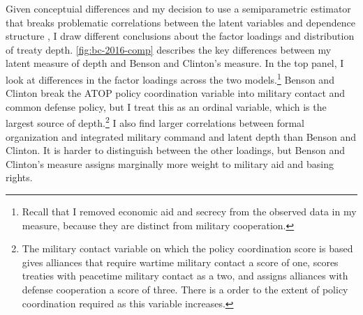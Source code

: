\documentclass[12pt]{article}
\begin{document}
Given conceptuial differences and my decision to use a semiparametric estimator that breaks problematic correlations between the latent variables and dependence structure \citep{Murrayetal2013}, I draw different conclusions about the factor loadings and distribution of treaty depth. 
\autoref{fig:bc-2016-comp} describes the key differences between my latent measure of depth and Benson and Clinton's measure.
In the top panel, I look at differences in the factor loadings across the two models.\footnote{Recall that I removed economic aid and secrecy from the observed data in my measure, because they are distinct from military cooperation.} 
Benson and Clinton break the ATOP policy coordination variable into military contact and common defense policy, but I treat this as an ordinal variable, which is the largest source of depth.\footnote{The military contact variable on which the policy coordination score is based gives alliances that require wartime military contact a score of one, scores treaties with peacetime military contact as a two, and assigns alliances with defense cooperation a score of three. There is a order to the extent of policy coordination required as this variable increases.}
I also find larger correlations between formal organization and integrated military command and latent depth than Benson and Clinton.
It is harder to distinguish between the other loadings, but Benson and Clinton's measure assigns marginally more weight to military aid and basing rights.  
\end{document}
